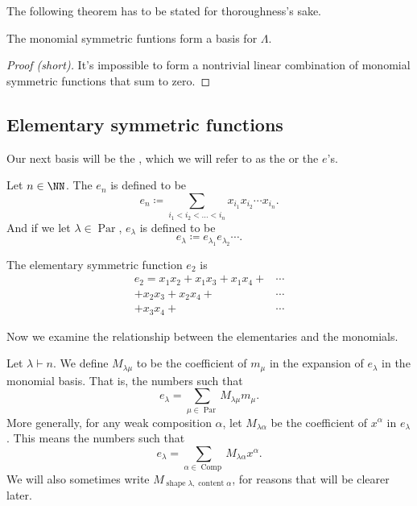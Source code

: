 \documentclass{article}
\DeclareMathOperator{\shape}{shape}
\DeclareMathOperator{\content}{content}
\DeclareMathOperator{\Par}{Par}
\DeclareMathOperator{\Com}{Comp}
\begin{document}
The following theorem has to be stated for thoroughness's sake.

\begin{theorem}
    The monomial symmetric funtions form a basis for $\Lambda$.
\end{theorem}

\begin{proof}[Proof (short)]
    It's impossible to form a nontrivial linear combination of monomial symmetric functions that sum to zero.
\end{proof}

\subsection{Elementary symmetric functions}

Our next basis will be the , which we will refer to as the  or the $e$'s.

\begin{definition}
    Let $n\in\NN$. 
    The  $e_n$ is defined to be
    \[
        e_n 
        \coloneq 
        \sum_{i_1<i_2<\ldots<i_n} x_{i_1}x_{i_2}\cdots x_{i_n}.
    \]
    And if we let $\lambda \in \Par$, $e_\lambda$ is defined to be
    \[
        e_\lambda 
        \coloneq 
        e_{\lambda_1}e_{\lambda_2}\cdots.
    \]
\end{definition}

\begin{example}
    The elementary symmetric function $e_2$ is
    \begin{align*}
        e_2 = x_1x_2 + x_1x_3 + x_1x_4 + &\cdots \\
        + x_2x_3 + x_2x_4 + &\cdots \\
        + x_3x_4 + &\cdots
    \end{align*}
\end{example}

Now we examine the relationship between the elementaries and the monomials.

\begin{definition}
    Let $\lambda \vdash n$. We define $M_{\lambda\mu}$ to be the coefficient of $m_\mu$ in the expansion of $e_\lambda$ in the monomial basis. That is, the numbers such that
    \[
        e_\lambda = \sum_{\mu \in \Par} M_{\lambda\mu} m_\mu.
    \]
    More generally, for any weak composition $\alpha$, let $M_{\lambda\alpha}$ be the coefficient of $x^\alpha$ in $e_\lambda$.
    This means the numbers such that
    \[
        e_\lambda = \sum_{\alpha \in \Com} M_{\lambda\alpha} x^\alpha.
    \]
    We will also sometimes write $M_{\shape \lambda, \content \alpha}$, for reasons that will be clearer later.
\end{definition}
\end{document}
